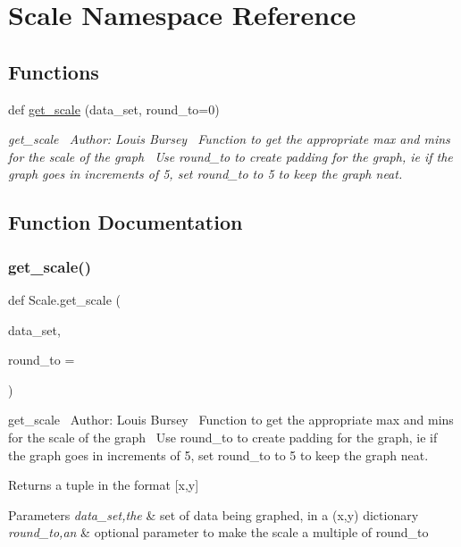 \hypertarget{namespace_scale}{}\section{Scale Namespace Reference}
\label{namespace_scale}
\subsection*{Functions}
\begin{DoxyCompactItemize}
\item 
def \hyperlink{namespace_scale_a7373795883c9c2c762635b7b67b53980}{get\+\_\+scale} (data\+\_\+set, round\+\_\+to=0)
\begin{DoxyCompactList}\small\item\em get\+\_\+scale~\newline
 Author\+: Louis Bursey~\newline
 Function to get the appropriate max and mins for the scale of the graph~\newline
 Use round\+\_\+to to create padding for the graph, ie if the graph goes in increments of 5, set round\+\_\+to to 5 to keep the graph neat. \end{DoxyCompactList}\end{DoxyCompactItemize}


\subsection{Function Documentation}
\hypertarget{namespace_scale_a7373795883c9c2c762635b7b67b53980}{}\label{namespace_scale_a7373795883c9c2c762635b7b67b53980} 
\subsubsection{\texorpdfstring{get\+\_\+scale()}{get\_scale()}}
{\footnotesize\ttfamily def Scale.\+get\+\_\+scale (\begin{DoxyParamCaption}\item[{}]{data\+\_\+set,  }\item[{}]{round\+\_\+to = {} }\end{DoxyParamCaption})}



get\+\_\+scale~\newline
 Author\+: Louis Bursey~\newline
 Function to get the appropriate max and mins for the scale of the graph~\newline
 Use round\+\_\+to to create padding for the graph, ie if the graph goes in increments of 5, set round\+\_\+to to 5 to keep the graph neat. 

Returns a tuple in the format \mbox{[}x,y\mbox{]} 
\begin{DoxyParams}{Parameters}
{\em data\+\_\+set,the} & set of data being graphed, in a (x,y) dictionary \\
\hline
{\em round\+\_\+to,an} & optional parameter to make the scale a multiple of round\+\_\+to \\
\hline
\end{DoxyParams}
